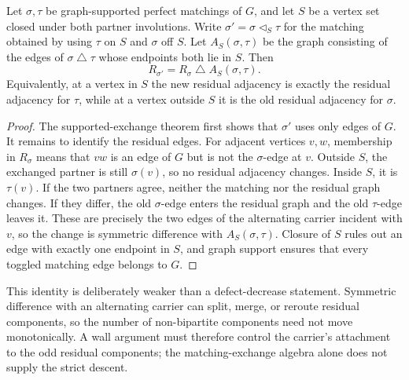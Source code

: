 \begin{lemma}
\label{lem:residual-exchange-symmetric-difference}
Let \(\sigma,\tau\) be graph-supported perfect matchings of \(G\), and let
\(S\) be a vertex set closed under both partner involutions.  Write
\(\sigma'=\sigma\triangleleft_S\tau\) for the matching obtained by using
\(\tau\) on \(S\) and \(\sigma\) off \(S\).  Let \(A_S(\sigma,\tau)\)
be the graph consisting of the edges of
\(\sigma\mathbin\triangle\tau\) whose endpoints both lie in \(S\).  Then
\[
 R_{\sigma'}=R_\sigma\mathbin\triangle A_S(\sigma,\tau).
\]
Equivalently, at a vertex in \(S\) the new residual adjacency is exactly
the residual adjacency for \(\tau\), while at a vertex outside \(S\) it is
the old residual adjacency for \(\sigma\).
\end{lemma}

\begin{proof}
The supported-exchange theorem first shows that \(\sigma'\) uses only edges
of \(G\).  It remains to identify the residual edges.
For adjacent vertices \(v,w\), membership in \(R_\sigma\) means that
\(vw\) is an edge of \(G\) but is not the \(\sigma\)-edge at \(v\).
Outside \(S\), the exchanged partner is still \(\sigma(v)\), so no
residual adjacency changes.  Inside \(S\), it is \(\tau(v)\).  If the two
partners agree, neither the matching nor the residual graph changes.  If
they differ, the old \(\sigma\)-edge enters the residual graph and the old
\(\tau\)-edge leaves it.  These are precisely the two edges of the
alternating carrier incident with \(v\), so the change is symmetric
difference with \(A_S(\sigma,\tau)\).  Closure of \(S\) rules out an edge
with exactly one endpoint in \(S\), and graph support ensures that every
toggled matching edge belongs to \(G\).
\end{proof}

This identity is deliberately weaker than a defect-decrease statement.
Symmetric difference with an alternating carrier can split, merge, or reroute
residual components, so the number of non-bipartite components need not move
monotonically.  A wall argument must therefore control the carrier's
attachment to the odd residual components; the matching-exchange algebra
alone does not supply the strict descent.

